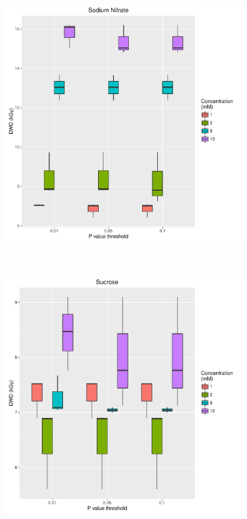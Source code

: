 \begin{figure}
\begin{subfigure}[b]{0.75\textwidth}
            \caption{}
            \label{}
    \end{subfigure}
\end{figure}
\begin{figure}
    \ContinuedFloat
    \centering
    \begin{subfigure}[b]{0.75\textwidth}
            \centering
            \includegraphics[width=\textwidth]{figures/saxs/Sodium_Nitrate_PThresh_comp.pdf}
            \caption{}
            \label{}
    \end{subfigure}
    \\
    \begin{subfigure}[b]{0.75\textwidth}
            \centering
            \includegraphics[width=\textwidth]{figures/saxs/Sucrose_PThresh_comp.pdf}

\end{subfigure}
\end{figure}
